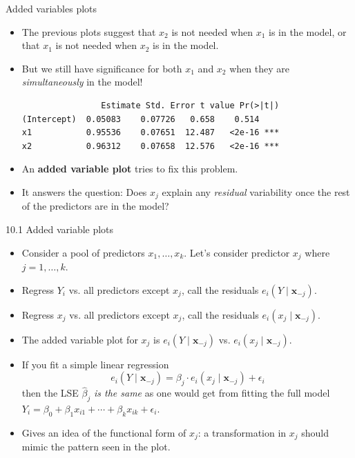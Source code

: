 \documentclass{beamer}
\begin{document}
\begin{frame}[fragile]{Added variables plots}
\begin{itemize}
    \item The previous plots suggest that $x_2$ is not needed when $x_1$ is in the model, \pause or that $x_1$ is not needed when $x_2$ is in the model.
    \item\pause But we still have significance for both $x_1$ and $x_2$ when they are \textit{simultaneously} in the model!
    \begin{footnotesize}
    \begin{verbatim}
                Estimate Std. Error t value Pr(>|t|)    
(Intercept)  0.05083    0.07726   0.658    0.514    
x1           0.95536    0.07651  12.487   <2e-16 ***
x2           0.96312    0.07658  12.576   <2e-16 ***
    \end{verbatim}
    \end{footnotesize}
    \item\pause An \textbf{added variable plot} tries to fix this problem.
    \item\pause It answers the question: Does $x_j$ explain any \textit{residual} variability once the rest of the predictors are in the model?
\end{itemize}
\end{frame}


\begin{frame}{10.1 Added variable plots}
\begin{itemize}
\item Consider a pool of predictors $x_1 , \ldots, x_k$. Let’s consider predictor $x_j$ where $j = 1, \ldots, k$.
\item\pause Regress $Y_i$ vs. all predictors except $x_j$, call the residuals $e_i(Y\mid\mathbf{x}_{-j})$.
\item\pause Regress $x_j$ vs. all predictors except $x_j$, call the residuals $e_i(x_j\mid\mathbf{x}_{-j})$.
\item\pause The added variable plot for $x_j$ is $e_i(Y\mid\mathbf{x}_{-j})$ vs. $e_i(x_j\mid\mathbf{x}_{-j})$.
\item\pause If you fit a simple linear regression
$$
e_i(Y\mid\mathbf{x}_{-j}) = \beta_j\cdot e_i(x_j\mid\mathbf{x}_{-j})+\epsilon_i
$$
then the LSE $\hat\beta_j$ \textit{is the same} as one would get from fitting the full model $Y_i = \beta_0 + \beta_1 x_{i1} + \cdots + \beta_k x_{ik} + \epsilon_i$. 
\item\pause Gives an idea of the functional form of $x_j$: a transformation in $x_j$ should mimic the pattern seen in the plot. %
\end{itemize}
\end{frame}
\end{document}
